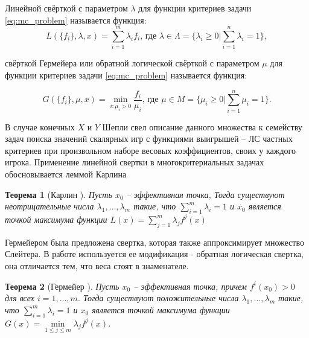 \begin{Def}
	Линейной свёрткой с параметром $\lambda$ для функции критериев задачи
	\eqref{eq:mc_problem} называется функция:
	\begin{equation}
		L(\{f_i\}, \lambda, x)=\sum_{i=1}^{m} \lambda_i f_i \textrm{, где }
		\lambda \in \Lambda =\{\lambda_i \geq 0 | \sum_{i=1}^n \lambda_i =1 \},
		\label{eq:linear_scalarization}
	\end{equation}

	\begin{flushleft}
	свёрткой Гермейера или обратной логической свёрткой с параметром $\mu$ для 
	функции критериев задачи \eqref{eq:mc_problem} называется функция:
	\end{flushleft}	
	
	\begin{equation}
		G(\{f_i\}, \mu, x)=
		\min \limits_{i: \mu_i > 0} \frac{f_i}{\mu_i} \textrm{, где }
		\mu \in M =\{\mu_i \geq 0 | \sum_{i=1}^n \mu_i =1 \}.
		\label{eq:germeyer_scalarization}	
	\end{equation}
\end{Def}

В случае конечных $X$ и $Y$ Шепли свел \cite{shapley} описание данного множества к
семейству задач поиска значений скалярных игр с функциями выигрышей – 
ЛС частных критериев при произвольном наборе весовых коэффициентов, 
своих у каждого игрока. Применение линейной свертки в многокритериальных 
задачах обосновывается леммой Карлина

\newtheorem{Th}{Теорема}
\begin{Th}[Карлин \cite{carlin}]
	Пусть $x_0$ – эффективная точка,
    Тогда существуют неотрицательные числа $\lambda_1,…,\lambda_m$ такие, 
    что $\sum_{i=1}^m \lambda_i=1$ и $x_0$ является точкой максимума функции  
    $L(x) =\sum_{j=1}^m \lambda_j f^j(x)$ 
\end{Th}

Гермейером была предложена свертка, которая также аппроксимирует 
множество Слейтера. В работе используется ее модификация -
обратная логическая свертка, она отличается тем, что веса стоят в знаменателе.

\begin{Th}[Гермейер \cite{germeyer}]
    Пусть $x_0$ – эффективная точка, причем $f^i(x_0)>0$ для всех 
    $i=1,…,m.$
    Тогда существуют положительные числа $\lambda_1,…,\lambda_m$ такие, 
    что $\sum_{i=1}^m \lambda_i=1$ и $x_0$ является точкой максимума функции  
    $G(x) =\min \limits_{1 \leqslant j \leqslant m} \lambda_j f^j(x)$.
\end{Th}


